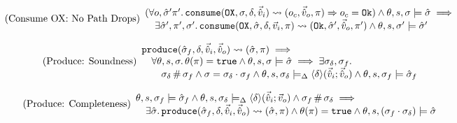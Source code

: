 \begin{equation}
\tag{Consume OX: No Path Drops}\label{eq:consume-ox-no-drop}
\begin{array}{l}
(\forall o, \hat{\sigma}'\pi'\ldotp \texttt{consume}(\texttt{OX},\sigma,\delta,\vec{\hat{v}}_i)\rightsquigarrow (o_c, \vec{\hat{v}}_o, \pi)\Rightarrow o_c = \texttt{Ok})\land \theta, s, \sigma \models \hat{\sigma} \implies \\
\quad \exists  \hat{\sigma}', \pi', \sigma'\ldotp \texttt{consume}(\texttt{OX}, \hat{\sigma}, \delta,\vec{v}_i,\pi)\rightsquigarrow (\texttt{Ok}, \hat{\sigma}', \vec{\hat{v}}_o, \pi') \land \theta,s,\sigma' \models \hat{\sigma}'
\end{array}
\end{equation}

\begin{equation}
\tag{Produce: Soundness}\label{eq:produce-sound}
\begin{array}{l}
\texttt{produce}(\hat{\sigma}_f,\delta,\vec{\hat{v}}_i,\vec{\hat{v}}_o)\rightsquigarrow (\hat{\sigma}, \pi) \implies\\
\quad \forall\theta,s,\sigma\ldotp \theta(\pi)=\texttt{true} \land \theta,s,\sigma\models\hat{\sigma} \implies \exists \sigma_\delta, \sigma_f\ldotp \\
\qquad \sigma_\delta\operatorname{\#}\sigma_f \land \sigma=\sigma_\delta\cdot\sigma_f \land \theta,s,\sigma_\delta \models_{\Delta} \left<\delta\right>\!(\vec{\hat{v}}_i;\vec{\hat{v}}_o) \land \theta,s,\sigma_f \models \hat{\sigma}_f
\end{array}
\end{equation}

\begin{equation}
\tag{Produce: Completeness}\label{eq:produce-complete}
\begin{array}{l}
\theta, s, \sigma_f \models \hat{\sigma}_f \land \theta, s, \sigma_\delta \models_{\Delta} \left<\delta\right>\!(\vec{\hat{v}}_i;\vec{v}_o) \land \sigma_f\operatorname{\#}\sigma_\delta \implies \\
\quad \exists \hat{\sigma}\ldotp \texttt{produce}(\hat{\sigma}_f,\delta,\vec{\hat{v}}_i,\vec{\hat{v}}_o)\rightsquigarrow (\hat{\sigma},\pi) \land \theta(\pi)=\texttt{true} \land \theta,s,(\sigma_f\cdot\sigma_\delta) \models \hat{\sigma}
\end{array}
\end{equation}

